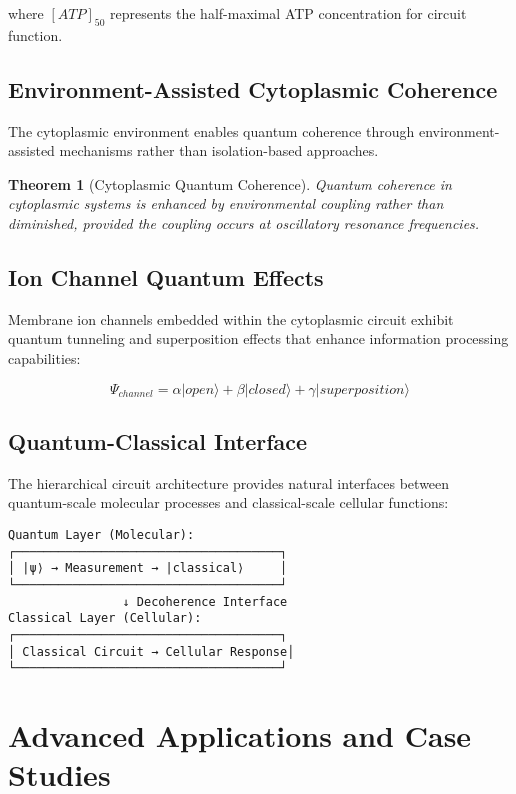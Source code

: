 \documentclass[12pt,a4paper]{article}
\newtheorem{theorem}{Theorem}[section]
\begin{document}
where $[ATP]_{50}$ represents the half-maximal ATP concentration for circuit function.

\subsection{Environment-Assisted Cytoplasmic Coherence}

The cytoplasmic environment enables quantum coherence through environment-assisted mechanisms rather than isolation-based approaches.

\begin{theorem}[Cytoplasmic Quantum Coherence]
Quantum coherence in cytoplasmic systems is enhanced by environmental coupling rather than diminished, provided the coupling occurs at oscillatory resonance frequencies.
\end{theorem}

\subsection{Ion Channel Quantum Effects}

Membrane ion channels embedded within the cytoplasmic circuit exhibit quantum tunneling and superposition effects that enhance information processing capabilities:

\begin{equation}
\Psi_{channel} = \alpha|open\rangle + \beta|closed\rangle + \gamma|superposition\rangle
\end{equation}

\subsection{Quantum-Classical Interface}

The hierarchical circuit architecture provides natural interfaces between quantum-scale molecular processes and classical-scale cellular functions:

\begin{verbatim}
Quantum Layer (Molecular):
┌─────────────────────────────────────┐
│ |ψ⟩ → Measurement → |classical⟩     │
└─────────────────────────────────────┘
                ↓ Decoherence Interface
Classical Layer (Cellular):
┌─────────────────────────────────────┐
│ Classical Circuit → Cellular Response│
└─────────────────────────────────────┘
\end{verbatim}

\section{Advanced Applications and Case Studies}
\end{document}

